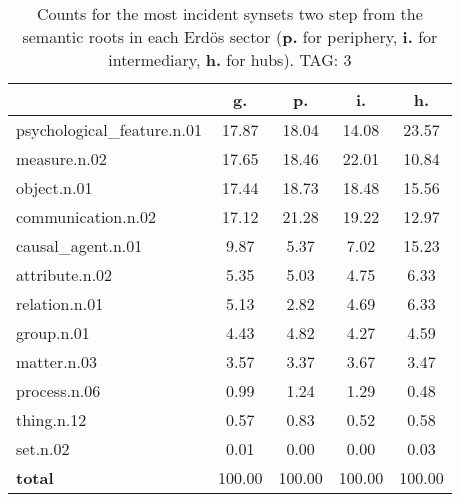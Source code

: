 \begin{table}[h!]
\begin{center}
\begin{tabular}{| l || c | c | c | c |}\hline
 & {\bf g.} & {\bf p.} & {\bf i.} & {\bf h.} \\\hline\hline
psychological\_feature.n.01 & 17.87  & 18.04  & 14.08  & 23.57 \\\hline
measure.n.02 & 17.65  & 18.46  & 22.01  & 10.84 \\\hline
object.n.01 & 17.44  & 18.73  & 18.48  & 15.56 \\\hline
communication.n.02 & 17.12  & 21.28  & 19.22  & 12.97 \\\hline
causal\_agent.n.01 & 9.87  & 5.37  & 7.02  & 15.23 \\\hline
attribute.n.02 & 5.35  & 5.03  & 4.75  & 6.33 \\\hline
relation.n.01 & 5.13  & 2.82  & 4.69  & 6.33 \\\hline
group.n.01 & 4.43  & 4.82  & 4.27  & 4.59 \\\hline
matter.n.03 & 3.57  & 3.37  & 3.67  & 3.47 \\\hline
process.n.06 & 0.99  & 1.24  & 1.29  & 0.48 \\\hline
thing.n.12 & 0.57  & 0.83  & 0.52  & 0.58 \\\hline
set.n.02 & 0.01  & 0.00  & 0.00  & 0.03 \\\hline\hline
{{\bf total}} & 100.00  & 100.00  & 100.00  & 100.00 \\\hline
\end{tabular}
\caption{Counts for the most incident synsets two step from the semantic roots in each Erd\"os sector ({\bf p.} for periphery, {\bf i.} for intermediary, {\bf h.} for hubs). TAG: 3}
\end{center}
\end{table}